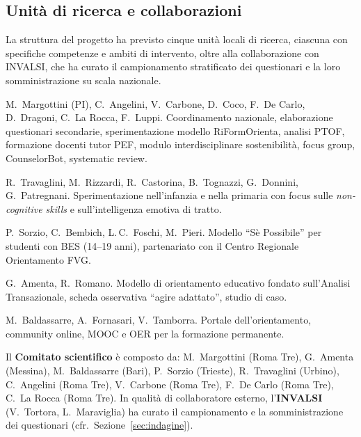 \documentclass[12pt,a4paper]{article}
\begin{document}
\subsection{Unit\`a di ricerca e collaborazioni}

La struttura del progetto ha previsto cinque unit\`a locali di ricerca, ciascuna con specifiche competenze e ambiti di intervento, oltre alla collaborazione con INVALSI, che ha curato il campionamento stratificato dei questionari e la loro somministrazione su scala nazionale.

\begin{description}[style=nextline, leftmargin=1.5cm]
  \item[\textbf{Universit\`a Roma Tre}] M.~Margottini (PI), C.~Angelini, V.~Carbone, D.~Coco, F.~De Carlo, D.~Dragoni, C.~La Rocca, F.~Luppi. Coordinamento nazionale, elaborazione questionari secondarie, sperimentazione modello RiFormOrienta, analisi PTOF, formazione docenti tutor PEF, modulo interdisciplinare sostenibilit\`a, focus group, CounselorBot, systematic review.
  \item[\textbf{Universit\`a di Urbino}] R.~Travaglini, M.~Rizzardi, R.~Castorina, B.~Tognazzi, G.~Donnini, G.~Patregnani. Sperimentazione nell'infanzia e nella primaria con focus sulle \textit{non-cognitive skills} e sull'intelligenza emotiva di tratto.
  \item[\textbf{Universit\`a di Trieste}] P.~Sorzio, C.~Bembich, L.\,C.~Foschi, M.~Pieri. Modello ``S\`e Possibile'' per studenti con BES (14--19 anni), partenariato con il Centro Regionale Orientamento FVG.
  \item[\textbf{Universit\`a di Messina}] G.~Amenta, R.~Romano. Modello di orientamento educativo fondato sull'Analisi Transazionale, scheda osservativa ``agire adattato'', studio di caso.
  \item[\textbf{Universit\`a di Bari}] M.~Baldassarre, A.~Fornasari, V.~Tamborra. Portale dell'orientamento, community online, MOOC e OER per la formazione permanente.
\end{description}

Il \textbf{Comitato scientifico} \`e composto da: M.~Margottini (Roma Tre), G.~Amenta (Messina), M.~Baldassarre (Bari), P.~Sorzio (Trieste), R.~Travaglini (Urbino), C.~Angelini (Roma Tre), V.~Carbone (Roma Tre), F.~De Carlo (Roma Tre), C.~La Rocca (Roma Tre). In qualit\`a di collaboratore esterno, l'\textbf{INVALSI} (V.~Tortora, L.~Maraviglia) ha curato il campionamento e la somministrazione dei questionari (cfr.\ Sezione~\ref{sec:indagine}).
\end{document}
